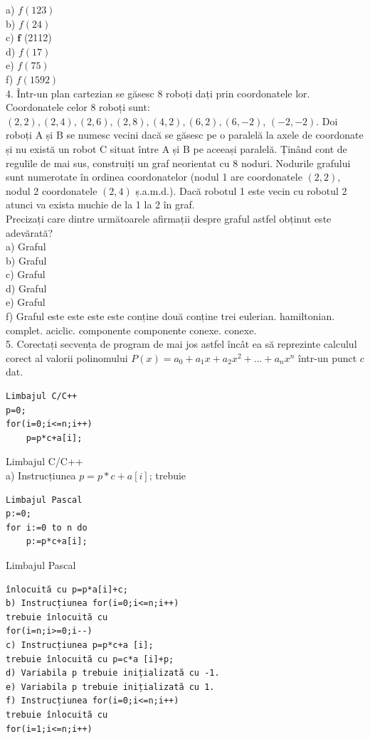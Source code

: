 \documentclass[10pt]{article}
\begin{document}
a) $f(123)$\\
b) $f(24)$\\
c) $\mathbf{f}$ (2112)\\
d) $f(17)$\\
e) $f(75)$\\
f) $f(1592)$\\
4. Într-un plan cartezian se găsesc 8 roboți dați prin coordonatele lor. Coordonatele celor 8 roboți sunt: $(2,2),(2,4),(2,6),(2,8),(4,2),(6,2),(6,-2)$, $(-2,-2)$. Doi roboți A și B se numesc vecini dacă se găsesc pe o paralelă la axele de coordonate și nu există un robot C situat între A și B pe aceeași paralelă. Ținând cont de regulile de mai sus, construiți un graf neorientat cu 8 noduri. Nodurile grafului sunt numerotate în ordinea coordonatelor (nodul 1 are coordonatele $(2,2)$, nodul 2 coordonatele $(2,4)$ ș.a.m.d.). Dacă robotul 1 este vecin cu robotul 2 atunci va exista muchie de la 1 la 2 în graf.\\
Precizați care dintre următoarele afirmații despre graful astfel obținut este adevărată?\\
a) Graful\\
b) Graful\\
c) Graful\\
d) Graful\\
e) Graful\\
f) Graful este este este este conține două conține trei eulerian. hamiltonian. complet. aciclic. componente componente conexe. conexe.\\
5. Corectați secvența de program de mai jos astfel încât ea să reprezinte calculul corect al valorii polinomului $P(x)=a_{0}+a_{1} x+a_{2} x^{2}+\ldots+a_{n} x^{n}$ într-un punct $c$ dat.

\begin{verbatim}
Limbajul C/C++
p=0;
for(i=0;i<=n;i++)
    p=p*c+a[i];
\end{verbatim}

Limbajul C/C++\\
a) Instrucțiunea $p=p * c+a[i]$; trebuie

\begin{verbatim}
Limbajul Pascal
p:=0;
for i:=0 to n do
    p:=p*c+a[i];
\end{verbatim}

Limbajul Pascal

\begin{verbatim}
înlocuită cu p=p*a[i]+c;
b) Instrucțiunea for(i=0;i<=n;i++)
trebuie înlocuită cu
for(i=n;i>=0;i--)
c) Instrucțiunea p=p*c+a [i];
trebuie înlocuită cu p=c*a [i]+p;
d) Variabila p trebuie inițializată cu -1.
e) Variabila p trebuie inițializată cu 1.
f) Instrucțiunea for(i=0;i<=n;i++)
trebuie înlocuită cu
for(i=1;i<=n;i++)
\end{verbatim}
\end{document}
